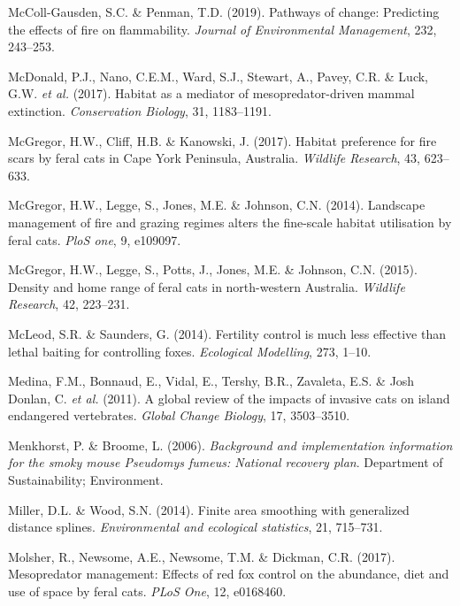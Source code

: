 \documentclass[11pt,a4paper,titlepage,twoside,openright]{style/unimelbthesis}
\begin{document}
\begin{mainmatter}
\leavevmode\hypertarget{ref-MCCOLLGAUSDEN2019243}{}%
McColl-Gausden, S.C. \& Penman, T.D. (2019). Pathways of change: Predicting the effects of fire on flammability. \emph{Journal of Environmental Management}, 232, 243--253.

\leavevmode\hypertarget{ref-mcdonald2017habitat}{}%
McDonald, P.J., Nano, C.E.M., Ward, S.J., Stewart, A., Pavey, C.R. \& Luck, G.W. \emph{et al.} (2017). Habitat as a mediator of mesopredator-driven mammal extinction. \emph{Conservation Biology}, 31, 1183--1191.

\leavevmode\hypertarget{ref-mcgregor2017habitat}{}%
McGregor, H.W., Cliff, H.B. \& Kanowski, J. (2017). Habitat preference for fire scars by feral cats in Cape York Peninsula, Australia. \emph{Wildlife Research}, 43, 623--633.

\leavevmode\hypertarget{ref-mcgregor2014landscape}{}%
McGregor, H.W., Legge, S., Jones, M.E. \& Johnson, C.N. (2014). Landscape management of fire and grazing regimes alters the fine-scale habitat utilisation by feral cats. \emph{PloS one}, 9, e109097.

\leavevmode\hypertarget{ref-mcgregor2015density}{}%
McGregor, H.W., Legge, S., Potts, J., Jones, M.E. \& Johnson, C.N. (2015). Density and home range of feral cats in north-western Australia. \emph{Wildlife Research}, 42, 223--231.

\leavevmode\hypertarget{ref-mcleod2014fertility}{}%
McLeod, S.R. \& Saunders, G. (2014). Fertility control is much less effective than lethal baiting for controlling foxes. \emph{Ecological Modelling}, 273, 1--10.

\leavevmode\hypertarget{ref-medina2011global}{}%
Medina, F.M., Bonnaud, E., Vidal, E., Tershy, B.R., Zavaleta, E.S. \& Josh Donlan, C. \emph{et al.} (2011). A global review of the impacts of invasive cats on island endangered vertebrates. \emph{Global Change Biology}, 17, 3503--3510.

\leavevmode\hypertarget{ref-menkhorst2006background}{}%
Menkhorst, P. \& Broome, L. (2006). \emph{Background and implementation information for the smoky mouse Pseudomys fumeus: National recovery plan}. Department of Sustainability; Environment.

\leavevmode\hypertarget{ref-miller2014finite}{}%
Miller, D.L. \& Wood, S.N. (2014). Finite area smoothing with generalized distance splines. \emph{Environmental and ecological statistics}, 21, 715--731.

\leavevmode\hypertarget{ref-molsher2017mesopredator}{}%
Molsher, R., Newsome, A.E., Newsome, T.M. \& Dickman, C.R. (2017). Mesopredator management: Effects of red fox control on the abundance, diet and use of space by feral cats. \emph{PLoS One}, 12, e0168460.


\end{mainmatter}
\end{document}
